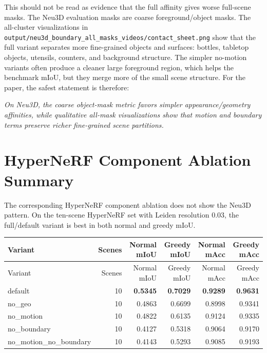\documentclass[10pt]{article}
\begin{document}
This should not be read as evidence that the full affinity gives worse full-scene masks.  The Neu3D evaluation masks are coarse foreground/object masks.  The all-cluster visualizations in \texttt{output/neu3d\_boundary\_all\_masks\_videos/contact\_sheet.png} show that the full variant separates more fine-grained objects and surfaces: bottles, tabletop objects, utensils, counters, and background structure.  The simpler no-motion variants often produce a cleaner large foreground region, which helps the benchmark mIoU, but they merge more of the small scene structure.  For the paper, the safest statement is therefore:

\emph{On Neu3D, the coarse object-mask metric favors simpler appearance/geometry affinities, while qualitative all-mask visualizations show that motion and boundary terms preserve richer fine-grained scene partitions.}

\section{HyperNeRF Component Ablation Summary}
The corresponding HyperNeRF component ablation does not show the Neu3D pattern.  On the ten-scene HyperNeRF set with Leiden resolution 0.03, the full/default variant is best in both normal and greedy mIoU.

\small
\begin{longtable}{lrrrrr}
\toprule
Variant & Scenes & Normal mIoU & Greedy mIoU & Normal mAcc & Greedy mAcc \\
\midrule
\endfirsthead
\toprule
Variant & Scenes & Normal mIoU & Greedy mIoU & Normal mAcc & Greedy mAcc \\
\midrule
\endhead
default & 10 & \textbf{0.5345} & \textbf{0.7029} & \textbf{0.9289} & \textbf{0.9631} \\
no\_geo & 10 & 0.4863 & 0.6699 & 0.8998 & 0.9341 \\
no\_motion & 10 & 0.4822 & 0.6135 & 0.9124 & 0.9335 \\
no\_boundary & 10 & 0.4127 & 0.5318 & 0.9064 & 0.9170 \\
no\_motion\_no\_boundary & 10 & 0.4143 & 0.5293 & 0.9085 & 0.9193 \\
\bottomrule
\end{longtable}
\normalsize
\end{document}
